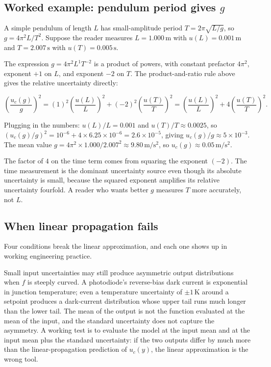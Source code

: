 \subsection{Worked example: pendulum period gives $g$}

A simple pendulum of length $L$ has small-amplitude period
$T = 2\pi\sqrt{L/g}$, so $g = 4\pi^{2} L / T^{2}$. Suppose the
reader measures $L = 1.000 \,\si{\meter}$ with
$u(L) = 0.001 \,\si{\meter}$ and $T = 2.007 \,\si{\second}$ with
$u(T) = 0.005 \,\si{\second}$.

The expression $g = 4\pi^{2} L^{1} T^{-2}$ is a product of powers,
with constant prefactor $4\pi^{2}$, exponent $+1$ on $L$, and
exponent $-2$ on $T$. The product-and-ratio rule above gives the
relative uncertainty directly:

\[
\left(\frac{u_{c}(g)}{g}\right)^{2} = (1)^{2}
\left(\frac{u(L)}{L}\right)^{2} + (-2)^{2}
\left(\frac{u(T)}{T}\right)^{2} =
\left(\frac{u(L)}{L}\right)^{2} + 4
\left(\frac{u(T)}{T}\right)^{2}.
\]

Plugging in the numbers: $u(L)/L = 0.001$ and
$u(T)/T \approx 0.0025$, so $(u_{c}(g)/g)^{2} = 10^{-6} +
4 \times 6.25 \times 10^{-6} = 2.6 \times 10^{-5}$, giving
$u_{c}(g)/g \approx 5 \times 10^{-3}$. The mean value
$g = 4\pi^{2} \times 1.000 / 2.007^{2} \approx 9.80 \,\si{\meter\per
\second\squared}$, so $u_{c}(g) \approx 0.05 \,\si{\meter\per
\second\squared}$.

The factor of $4$ on the time term comes from squaring the exponent
$(-2)$. The time measurement is the dominant uncertainty source even
though its absolute uncertainty is small, because the squared
exponent amplifies its relative uncertainty fourfold. A reader who
wants better $g$ measures $T$ more accurately, not $L$.

\subsection{When linear propagation fails}

Four conditions break the linear approximation, and each one shows
up in working engineering practice.

 Small input uncertainties may still produce
asymmetric output distributions when $f$ is steeply curved. A
photodiode's reverse-bias dark current is exponential in junction
temperature; even a temperature uncertainty of $\pm 1\,\si{\kelvin}$
around a setpoint produces a dark-current distribution whose upper
tail runs much longer than the lower tail. The mean of the output is
not the function evaluated at the mean of the input, and the
standard uncertainty does not capture the asymmetry. A working test
is to evaluate the model at the input mean and at the input mean
plus the standard uncertainty: if the two outputs differ by much
more than the linear-propagation prediction of $u_{c}(y)$, the
linear approximation is the wrong tool.

